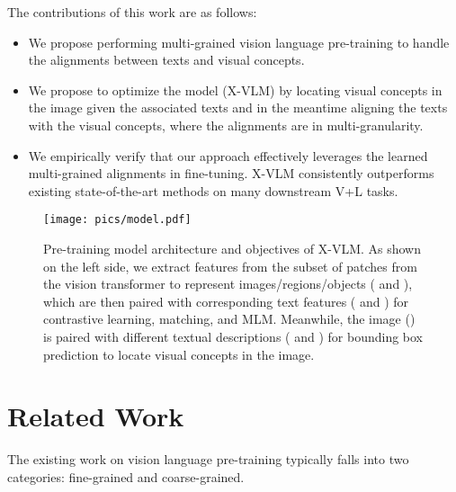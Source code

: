 \documentclass[nohyperref]{article}
\theoremstyle{plain}
\theoremstyle{definition}
\theoremstyle{remark}
\begin{document}
The contributions of this work are as follows:
\begin{itemize}

\item We propose performing multi-grained vision language pre-training to handle the alignments between texts and visual concepts. 

\item We propose to optimize the model (X-VLM) by locating visual concepts in the image given the associated texts and in the meantime aligning the texts with the visual concepts, where the alignments are in multi-granularity. 


\item  We empirically verify that our approach effectively leverages the learned multi-grained alignments in fine-tuning. X-VLM consistently outperforms existing state-of-the-art methods on many downstream V+L tasks.  
\end{itemize}




\begin{figure*}[ht]
\begin{center}
\centerline{\texttt{[image: pics/model.pdf]}}
\caption{Pre-training model architecture and objectives of X-VLM. As shown on the left side, we extract features from the subset of patches from the vision transformer to represent images/regions/objects ( and ), which are then paired with corresponding text features ( and ) for contrastive learning, matching, and MLM. Meanwhile, the image () is paired with different textual descriptions ( and ) for bounding box prediction to locate visual concepts in the image.}
\label{Fig:model}
\end{center}
\end{figure*}



\section{Related Work}
\label{sec:related}
The existing work on vision language pre-training typically falls into two categories: fine-grained and coarse-grained. 
\end{document}
